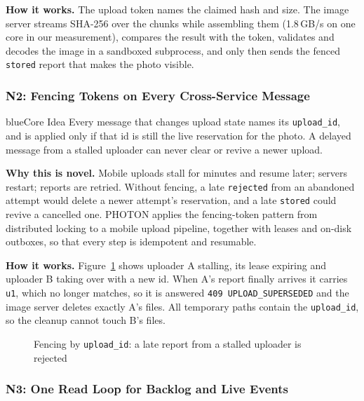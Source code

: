 \textbf{How it works.} The upload token names the claimed hash and size. The image server streams SHA-256 over the chunks while assembling them (1.8\,GB/s on one core in our measurement), compares the result with the token, validates and decodes the image in a sandboxed subprocess, and only then sends the fenced \texttt{stored} report that makes the photo visible.

\subsubsection{N2: Fencing Tokens on Every Cross-Service Message}

\begin{pbox}{blue}{Core Idea}
Every message that changes upload state names its \texttt{upload\_id}, and is applied only if that id is still the live reservation for the photo. A delayed message from a stalled uploader can never clear or revive a newer upload.
\end{pbox}

\textbf{Why this is novel.} Mobile uploads stall for minutes and resume later; servers restart; reports are retried. Without fencing, a late \texttt{rejected} from an abandoned attempt would delete a newer attempt's reservation, and a late \texttt{stored} could revive a cancelled one. PHOTON applies the fencing-token pattern from distributed locking to a mobile upload pipeline, together with leases and on-disk outboxes, so that every step is idempotent and resumable.

\textbf{How it works.} Figure~\ref{fig:fencing} shows uploader A stalling, its lease expiring and uploader B taking over with a new id. When A's report finally arrives it carries \texttt{u1}, which no longer matches, so it is answered \texttt{409 UPLOAD\_SUPERSEDED} and the image server deletes exactly A's files. All temporary paths contain the \texttt{upload\_id}, so the cleanup cannot touch B's files.

\begin{figure}[H]
\centering
{}
\caption{Fencing by \texttt{upload\_id}: a late report from a stalled uploader is rejected}\label{fig:fencing}
\end{figure}

\subsubsection{N3: One Read Loop for Backlog and Live Events}

